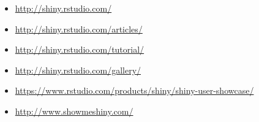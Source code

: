 \documentclass[
]{article}
\providecommand{\tightlist}{%
  \setlength{\itemsep}{0pt}\setlength{\parskip}{0pt}}
\begin{document}
\begin{itemize}
\tightlist
\item
  \url{http://shiny.rstudio.com/}
\item
  \url{http://shiny.rstudio.com/articles/}
\item
  \url{http://shiny.rstudio.com/tutorial/}
\item
  \url{http://shiny.rstudio.com/gallery/}
\item
  \url{https://www.rstudio.com/products/shiny/shiny-user-showcase/}
\item
  \url{http://www.showmeshiny.com/}
\end{itemize}
\end{document}
